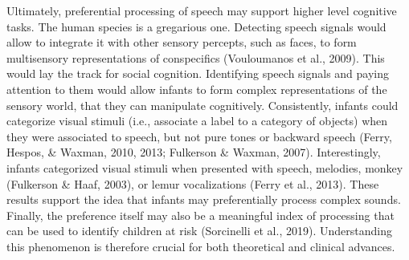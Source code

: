 \documentclass[man]{apa6}
\begin{document}
Ultimately, preferential processing of speech may support higher level cognitive tasks. The human species is a gregarious one. Detecting speech signals would allow to integrate it with other sensory percepts, such as faces, to form multisensory representations of conspecifics (Vouloumanos et al., 2009). This would lay the track for social cognition. Identifying speech signals and paying attention to them would allow infants to form complex representations of the sensory world, that they can manipulate cognitively. Consistently, infants could categorize visual stimuli (i.e., associate a label to a category of objects) when they were associated to speech, but not pure tones or backward speech (Ferry, Hespos, \& Waxman, 2010, 2013; Fulkerson \& Waxman, 2007). Interestingly, infants categorized visual stimuli when presented with speech, melodies, monkey (Fulkerson \& Haaf, 2003), or lemur vocalizations (Ferry et al., 2013). These results support the idea that infants may preferentially process complex sounds. Finally, the preference itself may also be a meaningful index of processing that can be used to identify children at risk (Sorcinelli et al., 2019). Understanding this phenomenon is therefore crucial for both theoretical and clinical advances.
\end{document}
